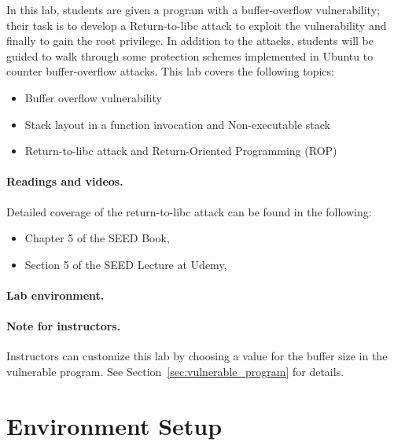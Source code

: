 In this lab, students are given a program with a buffer-overflow
vulnerability; their task is to develop a Return-to-libc attack
to exploit the vulnerability and finally to gain the root privilege.
In addition to the attacks, students will be guided to walk through
some protection schemes implemented in Ubuntu to
counter buffer-overflow attacks. 
This lab covers the following topics:

\begin{itemize}[noitemsep]
\item Buffer overflow vulnerability
\item Stack layout in a function invocation and Non-executable stack 
\item Return-to-libc attack and Return-Oriented Programming (ROP)
\end{itemize}


\paragraph{Readings and videos.}
Detailed coverage of the return-to-libc attack can be found in the following:

\begin{itemize}
\item Chapter 5 of the SEED Book, \seedbook
\item Section 5 of the SEED Lecture at Udemy, \seedcsvideo
\end{itemize}


\paragraph{Lab environment.} \seedenvironmentC


\paragraph{Note for instructors.}
Instructors can customize this lab by choosing a value
for the buffer size in the vulnerable program. 
See Section~\ref{sec:vulnerable_program} for details.





\section{Environment Setup}


